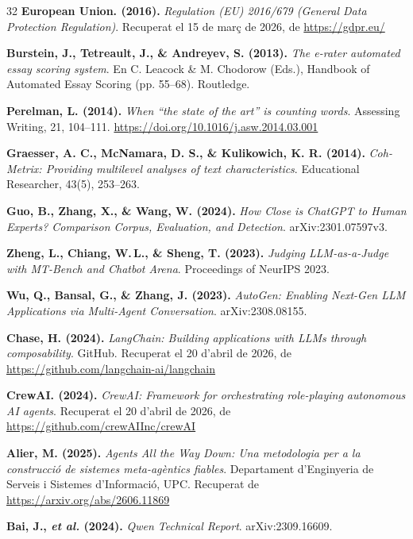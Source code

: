 \documentclass[12pt,a4paper,twoside]{report}
\begin{document}
\begin{thebibliography}{32}
     \textbf{European Union. (2016).} \textit{Regulation (EU) 2016/679 (General Data Protection Regulation)}. Recuperat el 15 de mar\c{c} de 2026, de \url{https://gdpr.eu/}

     \textbf{Burstein, J., Tetreault, J., \& Andreyev, S. (2013).} \textit{The e-rater automated essay scoring system}. En C. Leacock \& M. Chodorow (Eds.), Handbook of Automated Essay Scoring (pp. 55--68). Routledge.

     \textbf{Perelman, L. (2014).} \textit{When ``the state of the art'' is counting words}. Assessing Writing, 21, 104--111. \url{https://doi.org/10.1016/j.asw.2014.03.001}

     \textbf{Graesser, A. C., McNamara, D. S., \& Kulikowich, K. R. (2014).} \textit{Coh-Metrix: Providing multilevel analyses of text characteristics}. Educational Researcher, 43(5), 253--263.

     \textbf{Guo, B., Zhang, X., \& Wang, W. (2024).} \textit{How Close is ChatGPT to Human Experts? Comparison Corpus, Evaluation, and Detection}. arXiv:2301.07597v3.

     \textbf{Zheng, L., Chiang, W.\,L., \& Sheng, T. (2023).} \textit{Judging LLM-as-a-Judge with MT-Bench and Chatbot Arena}. Proceedings of NeurIPS 2023.

     \textbf{Wu, Q., Bansal, G., \& Zhang, J. (2023).} \textit{AutoGen: Enabling Next-Gen LLM Applications via Multi-Agent Conversation}. arXiv:2308.08155.

     \textbf{Chase, H. (2024).} \textit{LangChain: Building applications with LLMs through composability}. GitHub. Recuperat el 20 d'abril de 2026, de \url{https://github.com/langchain-ai/langchain}

     \textbf{CrewAI. (2024).} \textit{CrewAI: Framework for orchestrating role-playing autonomous AI agents}. Recuperat el 20 d'abril de 2026, de \url{https://github.com/crewAIInc/crewAI}

     \textbf{Alier, M. (2025).} \textit{Agents All the Way Down: Una metodologia per a la construcci\'o de sistemes meta-ag\`entics fiables}. Departament d'Enginyeria de Serveis i Sistemes d'Informaci\'o, UPC. Recuperat de \url{https://arxiv.org/abs/2606.11869}

     \textbf{Bai, J., \emph{et al.} (2024).} \textit{Qwen Technical Report}. arXiv:2309.16609.


\end{thebibliography}
\end{document}
